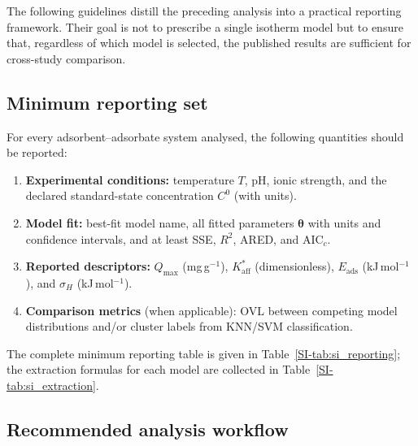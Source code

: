 \documentclass[journal=jacsat,manuscript=article]{achemso}
\begin{document}
	The following guidelines distill the preceding analysis into a practical reporting framework. Their goal is not to prescribe a single isotherm model but to ensure that, regardless of which model is selected, the published results are sufficient for cross-study comparison.

	\subsection{Minimum reporting set}
	\label{sec:min_reporting}

	For every adsorbent--adsorbate system analysed, the following quantities should be reported:
	\begin{enumerate}
		\item \textbf{Experimental conditions:} temperature $T$, pH, ionic strength, and the declared standard-state concentration $C^{0}$ (with units).
		\item \textbf{Model fit:} best-fit model name, all fitted parameters $\boldsymbol{\theta}$ with units and confidence intervals, and at least SSE, $R^2$, ARED, and AIC$_c$.
		\item \textbf{Reported descriptors:} $Q_{\max}$ (mg\,g$^{-1}$), $K_{\mathrm{aff}}^{\ast}$ (dimensionless), $E_{\mathrm{ads}}$ (kJ\,mol$^{-1}$), and $\sigma_H$ (kJ\,mol$^{-1}$).
		\item \textbf{Comparison metrics} (when applicable): OVL between competing model distributions and/or cluster labels from KNN/SVM classification.
	\end{enumerate}
	The complete minimum reporting table is given in Table~\ref{SI-tab:si_reporting}; the extraction formulas for each model are collected in Table~\ref{SI-tab:si_extraction}.

	\subsection{Recommended analysis workflow}
	\label{sec:workflow}
\end{document}
